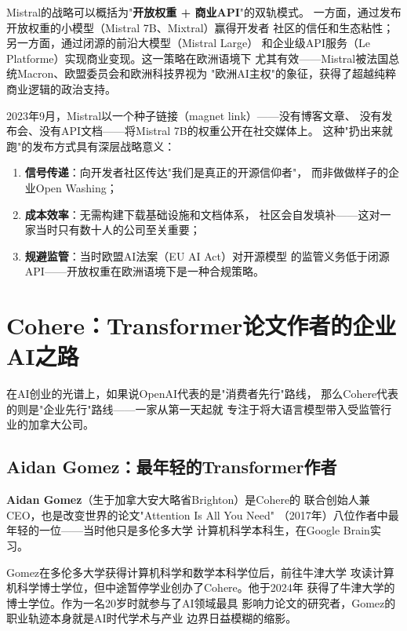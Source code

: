 Mistral的战略可以概括为"\textbf{开放权重 + 商业API}"的双轨模式。
一方面，通过发布开放权重的小模型（Mistral 7B、Mixtral）赢得开发者
社区的信任和生态粘性；另一方面，通过闭源的前沿大模型（Mistral Large）
和企业级API服务（Le Platforme）实现商业变现。这一策略在欧洲语境下
尤其有效——Mistral被法国总统Macron、欧盟委员会和欧洲科技界视为
"欧洲AI主权"的象征，获得了超越纯粹商业逻辑的政治支持。

\begin{whybox}
2023年9月，Mistral以一个种子链接（magnet link）——没有博客文章、
没有发布会、没有API文档——将Mistral 7B的权重公开在社交媒体上。
这种"扔出来就跑"的发布方式具有深层战略意义：
\begin{enumerate}
  \item \textbf{信号传递}：向开发者社区传达"我们是真正的开源信仰者"，
    而非做做样子的企业Open Washing；
  \item \textbf{成本效率}：无需构建下载基础设施和文档体系，
    社区会自发填补——这对一家当时只有数十人的公司至关重要；
  \item \textbf{规避监管}：当时欧盟AI法案（EU AI Act）对开源模型
    的监管义务低于闭源API——开放权重在欧洲语境下是一种合规策略。
\end{enumerate}
\end{whybox}


\section{Cohere：Transformer论文作者的企业AI之路}
\label{sec:cohere}

在AI创业的光谱上，如果说OpenAI代表的是"消费者先行"路线，
那么Cohere代表的则是"企业先行"路线——一家从第一天起就
专注于将大语言模型带入受监管行业的加拿大公司。

\subsection{Aidan Gomez：最年轻的Transformer作者}

\textbf{Aidan Gomez}（生于加拿大安大略省Brighton）是Cohere的
联合创始人兼CEO，也是改变世界的论文"Attention Is All You Need"
（2017年）八位作者中最年轻的一位——当时他只是多伦多大学
计算机科学本科生，在Google Brain实习。

Gomez在多伦多大学获得计算机科学和数学本科学位后，前往牛津大学
攻读计算机科学博士学位，但中途暂停学业创办了Cohere。他于2024年
获得了牛津大学的博士学位。作为一名20岁时就参与了AI领域最具
影响力论文的研究者，Gomez的职业轨迹本身就是AI时代学术与产业
边界日益模糊的缩影。

